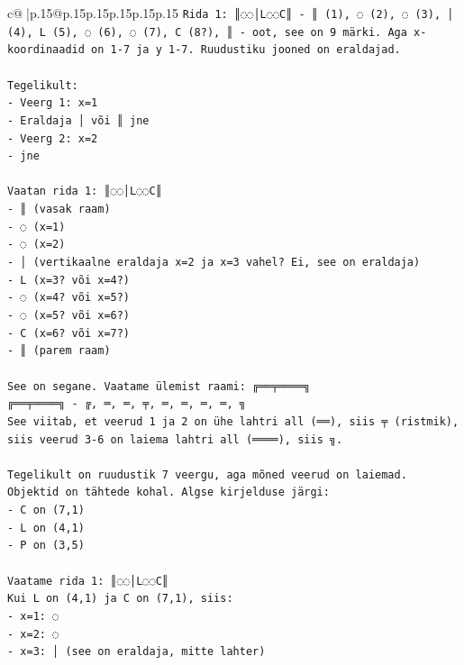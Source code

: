 \documentclass{article}
\begin{document}
{\begin{supertabular}{c@{$\;$}|p{.15\linewidth}@{}p{.15\linewidth}p{.15\linewidth}p{.15\linewidth}p{.15\linewidth}p{.15\linewidth}}
{{{\texttt{Rida 1: ║◌◌│L◌◌C║ {-} ║ (1), ◌ (2), ◌ (3), │ (4), L (5), ◌ (6), ◌ (7), C (8?), ║ {-} oot, see on 9 märki. Aga x{-}koordinaadid on 1{-}7 ja y 1{-}7. Ruudustiku jooned on eraldajad.} \\
\\ 
\texttt{Tegelikult:} \\
\texttt{{-} Veerg 1: x=1} \\
\texttt{{-} Eraldaja │ või ║ jne} \\
\texttt{{-} Veerg 2: x=2} \\
\texttt{{-} jne} \\
\\ 
\texttt{Vaatan rida 1: ║◌◌│L◌◌C║} \\
\texttt{{-} ║ (vasak raam)} \\
\texttt{{-} ◌ (x=1)} \\
\texttt{{-} ◌ (x=2)} \\
\texttt{{-} │ (vertikaalne eraldaja x=2 ja x=3 vahel? Ei, see on eraldaja)} \\
\texttt{{-} L (x=3? või x=4?)} \\
\texttt{{-} ◌ (x=4? või x=5?)} \\
\texttt{{-} ◌ (x=5? või x=6?)} \\
\texttt{{-} C (x=6? või x=7?)} \\
\texttt{{-} ║ (parem raam)} \\
\\ 
\texttt{See on segane. Vaatame ülemist raami: ╔══╤════╗} \\
\texttt{╔══╤════╗ {-} ╔, ═, ═, ╤, ═, ═, ═, ═, ╗} \\
\texttt{See viitab, et veerud 1 ja 2 on ühe lahtri all (══), siis ╤ (ristmik), siis veerud 3{-}6 on laiema lahtri all (════), siis ╗.} \\
\\ 
\texttt{Tegelikult on ruudustik 7 veergu, aga mõned veerud on laiemad. Objektid on tähtede kohal. Algse kirjelduse järgi:} \\
\texttt{{-} C on (7,1)} \\
\texttt{{-} L on (4,1)} \\
\texttt{{-} P on (3,5)} \\
\\ 
\texttt{Vaatame rida 1: ║◌◌│L◌◌C║} \\
\texttt{Kui L on (4,1) ja C on (7,1), siis:} \\
\texttt{{-} x=1: ◌} \\
\texttt{{-} x=2: ◌} \\
\texttt{{-} x=3: │ (see on eraldaja, mitte lahter)} \\
}}}
\end{supertabular}}
\end{document}
